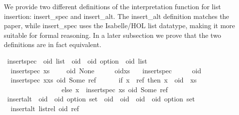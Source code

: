 \begin{isabellebody}
\begin{isamarkuptext}
We provide two different definitions of the interpretation function for list
insertion: insert\_spec and insert\_alt. The insert\_alt definition matches
the paper, while insert\_spec uses the Isabelle/HOL list datatype, making it
more suitable for formal reasoning. In a later subsection we prove that the
two definitions are in fact equivalent.%
\end{isamarkuptext}\isamarkuptrue%
\isamarkupfalse%
\ insert{\isacharunderscore}spec\ {\isacharcolon}{\isacharcolon}\ {\isachardoublequoteopen}{\isacharprime}oid\ list\ {\isasymRightarrow}\ {\isacharparenleft}{\isacharprime}oid\ {\isasymtimes}\ {\isacharprime}oid\ option{\isacharparenright}\ {\isasymRightarrow}\ {\isacharprime}oid\ list{\isachardoublequoteclose}\ \isanewline
\ \ {\isachardoublequoteopen}insert{\isacharunderscore}spec\ xs\ \ \ \ \ {\isacharparenleft}oid{\isacharcomma}\ None{\isacharparenright}\ \ \ \ \ {\isacharequal}\ oid{\isacharhash}xs{\isachardoublequoteclose}\ {\isacharbar}\isanewline
\ \ {\isachardoublequoteopen}insert{\isacharunderscore}spec\ {\isacharbrackleft}{\isacharbrackright}\ \ \ \ \ {\isacharparenleft}oid{\isacharcomma}\ {\isacharunderscore}{\isacharparenright}\ \ \ \ \ \ \ \ {\isacharequal}\ {\isacharbrackleft}{\isacharbrackright}{\isachardoublequoteclose}\ {\isacharbar}\isanewline
\ \ {\isachardoublequoteopen}insert{\isacharunderscore}spec\ {\isacharparenleft}x{\isacharhash}xs{\isacharparenright}\ {\isacharparenleft}oid{\isacharcomma}\ Some\ ref{\isacharparenright}\ {\isacharequal}\isanewline
\ \ \ \ \ {\isacharparenleft}if\ x\ {\isacharequal}\ ref\ then\ x\ {\isacharhash}\ oid\ {\isacharhash}\ xs\isanewline
\ \ \ \ \ \ \ \ \ \ \ \ \ \ \ \ \ else\ x\ {\isacharhash}\ {\isacharparenleft}insert{\isacharunderscore}spec\ xs\ {\isacharparenleft}oid{\isacharcomma}\ Some\ ref{\isacharparenright}{\isacharparenright}{\isacharparenright}{\isachardoublequoteclose}\isanewline
\isanewline
{}\isamarkupfalse%
\ insert{\isacharunderscore}alt\ {\isacharcolon}{\isacharcolon}\ {\isachardoublequoteopen}{\isacharparenleft}{\isacharprime}oid\ {\isasymtimes}\ {\isacharprime}oid\ option{\isacharparenright}\ set\ {\isasymRightarrow}\ {\isacharparenleft}{\isacharprime}oid\ {\isasymtimes}\ {\isacharprime}oid{\isacharparenright}\ {\isasymRightarrow}\ {\isacharparenleft}{\isacharprime}oid\ {\isasymtimes}\ {\isacharprime}oid\ option{\isacharparenright}\ set{\isachardoublequoteclose}\ \isanewline
\ \ {\isachardoublequoteopen}insert{\isacharunderscore}alt\ list{\isacharunderscore}rel\ {\isacharparenleft}oid{\isacharcomma}\ ref{\isacharparenright}\ {\isacharequal}\ {\isacharparenleft}\isanewline

\end{isabellebody}
